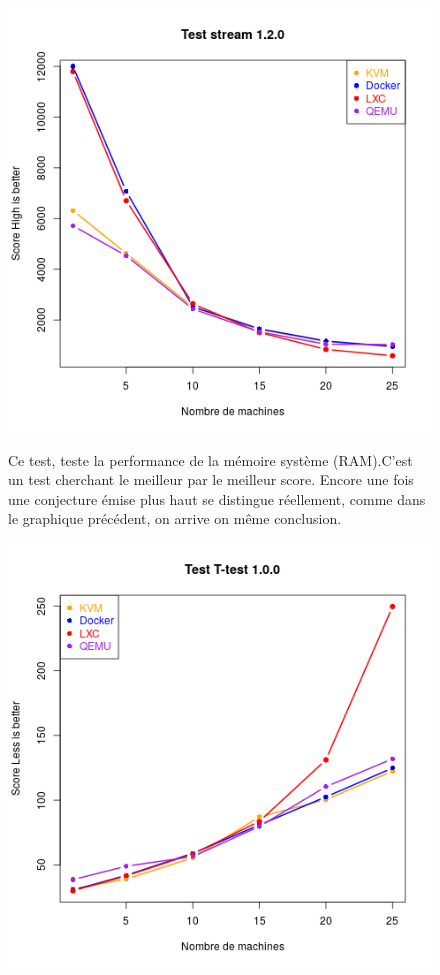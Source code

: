 \begin{figure}[h]
   \begin{minipage}[c]{.46\linewidth}
	 \includegraphics[scale=0.5]{resultats/stream.png}
   \end{minipage} \hfill
   \begin{minipage}[c]{.46\linewidth}
     Ce test, teste la performance de la mémoire système (RAM).C'est un test cherchant le meilleur par le meilleur score. Encore une fois une conjecture émise plus haut se distingue réellement, comme dans le graphique précédent, on arrive on même conclusion.
   \end{minipage}
\end{figure}
\newpage
\begin{figure}[h]
\centering
\includegraphics[scale=0.8]{resultats/t-test.png} 
\end{figure}
